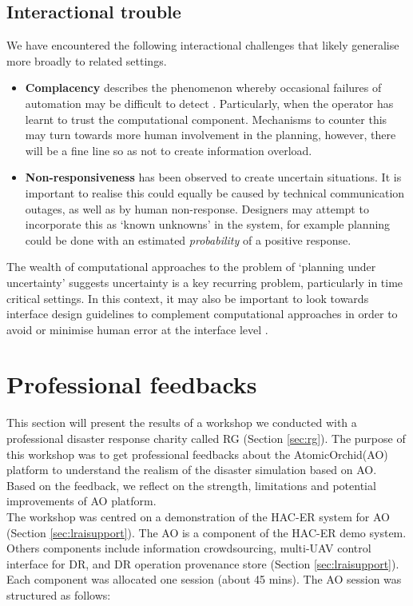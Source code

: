 \subsection{Interactional trouble}
We have encountered the following interactional challenges that likely generalise more broadly to related settings.
\begin{itemize}

\item \textbf{Complacency} describes the phenomenon whereby occasional failures of automation may be difficult to detect \citep{Kaber1997}. Particularly, when the operator has learnt to trust the computational component. Mechanisms to counter this may turn towards more human involvement in the planning, however, there will be a fine line so as not to create information overload. 
\item \textbf{Non-responsiveness} has been observed to create uncertain situations. It is important to realise this could equally be caused by technical communication outages, as well as by human non-response. Designers may attempt to incorporate this as  `known unknowns' in the system, for example planning could be done with an estimated \textit{probability} of a positive response. 
\end{itemize}   

The wealth of computational approaches to the problem of `planning under uncertainty' \citep{Chang2007} suggests uncertainty is a key recurring problem, particularly in time critical settings. In this context, it may also be important to look towards interface design guidelines to complement computational approaches in order to avoid or minimise human error at the interface level \citep{Norman2013}.


\section{Professional feedbacks}\label{sec:RGworkshopone} 

This section will present the results of a workshop we conducted with a professional disaster response charity called \acf{RG} (Section \ref{sec:rg}). The purpose of this workshop was to get professional feedbacks about the AtomicOrchid(AO) platform to understand the realism of the disaster simulation based on AO. Based on the feedback, we reflect on the strength, limitations and potential improvements of AO platform. \\

The workshop was centred on a demonstration of the HAC-ER system for \acf{AO} (Section \ref{sec:lraisupport}). The AO is a component of the HAC-ER demo system. Others components include information crowdsourcing, multi-UAV control interface for DR, and DR operation provenance store (Section \ref{sec:lraisupport}). Each component was allocated one session (about 45 mins). The AO session was structured as follows:\\

